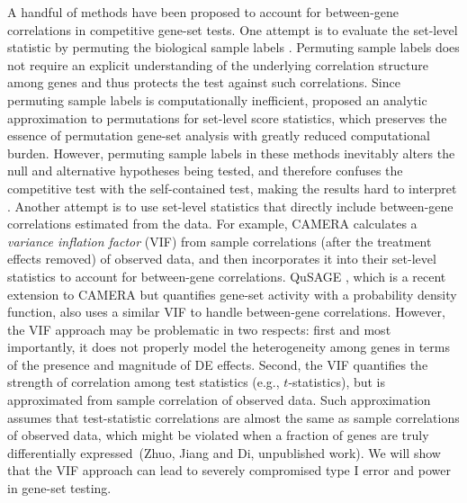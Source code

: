 \documentclass[a4,center,fleqn]{NAR}
\newcommand{\thepapertobefinished}{Zhuo, Jiang and Di, unpublished work}
\newcommand{\DED}{differentially expressed}
\begin{document}
A handful of methods have been proposed to account for between-gene correlations in competitive 
gene-set tests. One attempt is to evaluate the set-level statistic by permuting the biological 
sample labels \citep{efron2007testing,subramanian2005gene}. Permuting sample labels
does not require an explicit understanding of the underlying correlation structure among genes 
and thus protects the test against such correlations. Since permuting sample labels is 
computationally	inefficient, \citet{zhou2013empirical} proposed an analytic approximation to 
permutations for set-level score statistics, which preserves the essence of permutation 
gene-set analysis with greatly reduced computational burden. However, permuting sample labels 
in these methods inevitably alters the null and alternative hypotheses being tested, and 
therefore confuses the competitive test with the self-contained test, making the results hard 
to interpret \citep{goeman2007analyzing, khatri2012ten, wu2012camera}. Another attempt is to 
use set-level statistics that directly include between-gene correlations estimated from the 
data. For example, CAMERA \citep{wu2012camera} calculates a \textit{variance inflation factor} 
(VIF) from sample correlations (after the treatment effects removed) of observed data, and then 
incorporates it into their set-level statistics to account for between-gene correlations. 
QuSAGE \citep{yaari2013quantitative}, which is a recent	extension to CAMERA but quantifies 
gene-set activity with a probability density function, also uses a similar VIF to handle 
between-gene correlations. However, the VIF approach may be problematic in two respects: first 
and most importantly, it does not properly model the heterogeneity among genes in 
terms of the presence and magnitude of DE effects. 
Second, the VIF quantifies the strength of 
correlation among test statistics (e.g., 
$t$-statistics), but is approximated from sample correlation of observed 
data. Such approximation assumes that test-statistic correlations are almost the same as sample 
correlations of observed data, which might be violated when a fraction of 
genes are  truly \DED~(\thepapertobefinished). We will show that the VIF approach can lead to 
severely compromised type I error and power in gene-set testing. 
\end{document}
